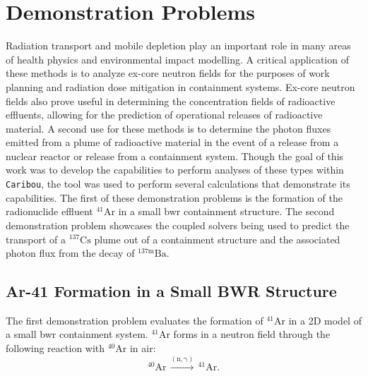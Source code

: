\chapter{Demonstration Problems} 
\label{demos}

Radiation transport and mobile depletion play an important role in many areas of health physics and environmental impact modelling. A critical application of these methods is to analyze ex-core neutron fields for the purposes of work planning and radiation dose mitigation in containment systems. Ex-core neutron fields also prove useful in determining the concentration fields of radioactive effluents, allowing for the prediction of operational releases of radioactive material. A second use for these methods is to determine the photon fluxes emitted from a plume of radioactive material in the event of a release from a nuclear reactor or release from a containment system. Though the goal of this work was to develop the capabilities to perform analyses of these types within \texttt{Caribou}, the tool was used to perform several calculations that demonstrate its capabilities. The first of these demonstration problems is the formation of the radionuclide effluent $\mathrm{^{41}Ar}$ in a small \acrfull{bwr} containment structure. The second demonstration problem showcases the coupled solvers being used to predict the transport of a $\mathrm{^{137}Cs}$ plume out of a containment structure and the associated photon flux from the decay of $\mathrm{^{137m}Ba}$.

\section{Ar-41 Formation in a Small BWR Structure}
\label{demos:demonstrations:ar41_bwr}

The first demonstration problem evaluates the formation of $\mathrm{^{41}Ar}$ in a 2D model of a small \acrshort{bwr} containment system. $\mathrm{^{41}Ar}$ forms in a neutron field through the following reaction with  $\mathrm{^{40}Ar}$ in air:
\begin{equation*}
    \mathrm{^{40}Ar}\, \xrightarrow{\mathrm{(n,\gamma)}} \,\mathrm{^{41}Ar}\text{.}
\end{equation*}

